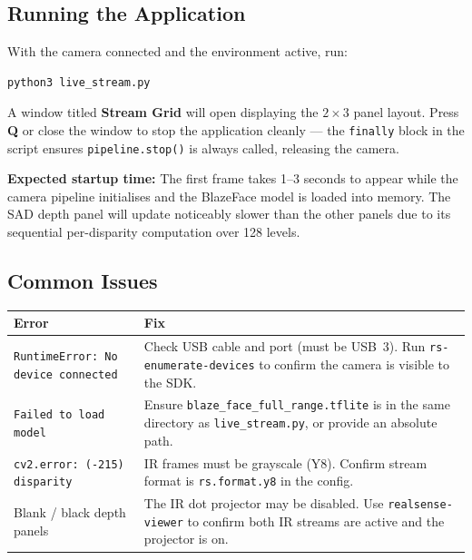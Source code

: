 \documentclass[12pt, a4paper]{article}
\newcommand{\code}[1]{\texttt{\small#1}}
\begin{document}
\subsection{Running the Application}

With the camera connected and the environment active, run:

\begin{lstlisting}[language=sh, caption={Launch the live stream}]
python3 live_stream.py
\end{lstlisting}

A window titled \textbf{Stream Grid} will open displaying the $2 \times 3$
panel layout. Press \textbf{Q} or close the window to stop the application
cleanly --- the \code{finally} block in the script ensures
\code{pipeline.stop()} is always called, releasing the camera.

\begin{notebox}
\textbf{Expected startup time:} The first frame takes 1--3 seconds to appear
while the camera pipeline initialises and the BlazeFace model is loaded into
memory. The SAD depth panel will update noticeably slower than the other panels
due to its sequential per-disparity computation over 128 levels.
\end{notebox}

\subsection{Common Issues}

\begin{center}
\begin{tabularx}{\linewidth}{lX}
  \toprule
  \textbf{Error} & \textbf{Fix} \\
  \midrule
  \code{RuntimeError: No device connected} &
    Check USB cable and port (must be USB~3). Run \code{rs-enumerate-devices}
    to confirm the camera is visible to the SDK. \\[4pt]
  \code{Failed to load model} &
    Ensure \code{blaze\_face\_full\_range.tflite} is in the same directory as
    \code{live\_stream.py}, or provide an absolute path. \\[4pt]
  \code{cv2.error: (-215) disparity} &
    IR frames must be grayscale (Y8). Confirm stream format is
    \code{rs.format.y8} in the config. \\[4pt]
  Blank / black depth panels &
    The IR dot projector may be disabled. Use \code{realsense-viewer} to
    confirm both IR streams are active and the projector is on. \\
  \bottomrule
\end{tabularx}
\end{center}
\end{document}
